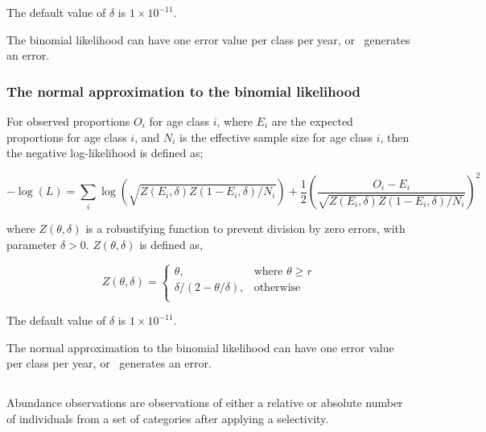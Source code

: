 The default value of $\delta$ is $1 \times 10^{-11}$.

\TODO

The binomial likelihood can have one error value per class per year, or \SPM\ generates an error.

\TODOend

\subsubsection*{The normal approximation to the binomial likelihood}

For observed proportions $O_i$ for age class $i$, where $E_i$ are the expected proportions for age class $i$, and $N_i$ is the effective sample size for age class $i$, then the negative log-likelihood is defined as;  

\begin{equation}
  -\log \left(L \right)= \sum\limits_i \log \left( \sqrt{Z\left(E_i,\delta \right)Z\left(1-E_i,\delta\right)/N_i} \right)     + \frac{1}{2} \left( \frac{O_i-E_i}{\sqrt{Z\left(E_i,\delta\right)Z\left(1-E_i,\delta \right)/N_i}} \right)^2
\end{equation}

where $Z \left(\theta,\delta \right)$ is a robustifying function to prevent division by zero errors, with parameter $\delta>0$. $Z \left(\theta,\delta \right)$ is defined as,

\begin{equation}
   Z \left(\theta,\delta \right) = \begin{cases}
	  \theta, & \text{where $\theta \ge r$} \\
	  \delta/\left( 2-\theta/\delta \right), & \text{otherwise} \\  
  \end{cases}
\end{equation}

The default value of $\delta$ is $1 \times 10^{-11}$.

\TODO

The normal approximation to the binomial likelihood can have one error value per class per year, or \SPM\ generates an error.

\TODOend

\subsection{}

Abundance observations are observations of either a relative or absolute number of individuals from a set of categories after applying a selectivity. 

